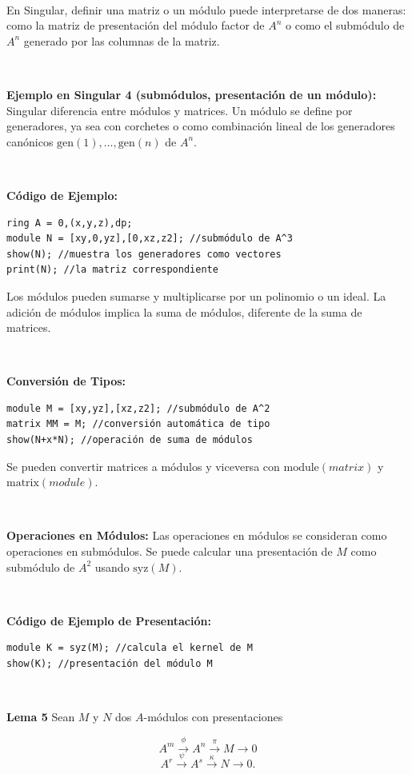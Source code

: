 \documentclass[10pt,a4paper]{article}
\begin{document}
\begin{enumerate}[label=(\alph*)]
\

En Singular, definir una matriz o un módulo puede interpretarse de dos maneras: como la matriz de presentación del módulo factor de \( A^n \) o como el submódulo de \( A^n \) generado por las columnas de la matriz.

\

\textbf{Ejemplo en Singular 4 (submódulos, presentación de un módulo):}
Singular diferencia entre módulos y matrices. Un módulo se define por generadores, ya sea con corchetes o como combinación lineal de los generadores canónicos \( \text{gen}(1), \ldots, \text{gen}(n) \) de \( A^n \).

\

\textbf{Código de Ejemplo:}
\begin{verbatim}
ring A = 0,(x,y,z),dp;
module N = [xy,0,yz],[0,xz,z2]; //submódulo de A^3
show(N); //muestra los generadores como vectores
print(N); //la matriz correspondiente
\end{verbatim}

Los módulos pueden sumarse y multiplicarse por un polinomio o un ideal. La adición de módulos implica la suma de módulos, diferente de la suma de matrices.

\

\textbf{Conversión de Tipos:}
\begin{verbatim}
module M = [xy,yz],[xz,z2]; //submódulo de A^2
matrix MM = M; //conversión automática de tipo
show(N+x*N); //operación de suma de módulos
\end{verbatim}

Se pueden convertir matrices a módulos y viceversa con \( \text{module}(matrix) \) y \( \text{matrix}(module) \).

\

\textbf{Operaciones en Módulos:}
Las operaciones en módulos se consideran como operaciones en submódulos. Se puede calcular una presentación de \( M \) como submódulo de \( A^2 \) usando \( \text{syz}(M) \).

\

\textbf{Código de Ejemplo de Presentación:}
\begin{verbatim}
module K = syz(M); //calcula el kernel de M
show(K); //presentación del módulo M
\end{verbatim}

\

\textbf{Lema 5} Sean \( M \) y \( N \) dos \( A \)-módulos con presentaciones

\[ A^m \xrightarrow{\phi} A^n \xrightarrow{\pi} M \to 0 \]
\[ A^r \xrightarrow{\psi} A^s \xrightarrow{\kappa} N \to 0. \]


\end{enumerate}
\end{document}
